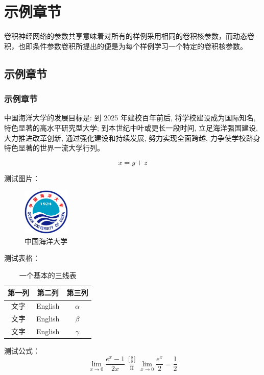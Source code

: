 \section{示例章节}
卷积神经网络的参数共享意味着对所有的样例采用相同的卷积核参数，而动态卷积，也即条件参数卷积所提出的便是为每个样例学习一个特定的卷积核参数。

\subsection{示例章节}
\subsubsection{示例章节}{
    中国海洋大学的发展目标是: 到 2025 年建校百年前后, 将学校建设成为国际知名, 特色显著的高水平研究型大学; 到本世纪中叶或更长一段时间, 立足海洋强国建设, 大力推进改革创新, 通过强化建设和持续发展, 努力实现全面跨越, 力争使学校跻身特色显著的世界一流大学行列。
}

\begin{equation}
    x = y+z
\end{equation}

测试图片：
\begin{figure}[!htbp]
    \centering
    \includegraphics[width = 0.2\textwidth]{assets/logo}
    \caption{中国海洋大学}
    \label{fig:ouc1}
\end{figure}

测试表格：
\begin{table}[!htbp]
    \centering
    \caption{一个基本的三线表}
    \begin{tabular*}{350pt}{@{\extracolsep{\fill}}ccc}
        \toprule
        第一列 & 第二列     & 第三列      \\
        \midrule
        文字  & English & $\alpha$ \\
        文字  & English & $\beta$  \\
        文字  & English & $\gamma$ \\
        \bottomrule
    \end{tabular*}
\end{table}

测试公式：
\begin{equation}
    \lim_{x\to 0}{\frac{e^x-1}{2x}}
    \overset{\left[\frac{0}{0}\right]}{\underset{\mathrm{H}}{=}}
    \lim_{x\to 0}{\frac{e^x}{2}}={\frac{1}{2}}
\end{equation}
\newpage
